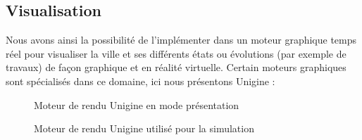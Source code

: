 \subsection{Visualisation}
Nous avons ainsi la possibilité de l'implémenter dans un moteur graphique temps réel pour visualiser la ville et ses différents états ou évolutions (par exemple de travaux) de façon graphique et en réalité virtuelle. Certain moteurs graphiques sont spécialisés dans ce domaine, ici nous présentons Unigine :

\begin{figure}[h]
    \centering
    \qquad
    \caption{Moteur de rendu Unigine en mode présentation}
    \label{fig:Ud}
\end{figure}
\FloatBarrier

\begin{figure}[h]
    \centering
    \qquad
    \caption{Moteur de rendu Unigine utilisé pour la simulation}
    \label{fig:U2}
\end{figure}
\FloatBarrier


